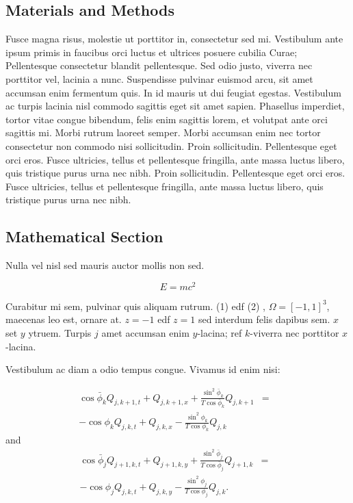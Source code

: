 \documentclass[a0,landscape]{a0poster}
\begin{document}
\begin{multicols}{4}
\section*{Materials and Methods}

Fusce magna risus, molestie ut porttitor in, consectetur sed mi. Vestibulum ante ipsum primis in faucibus orci luctus et ultrices posuere cubilia Curae; Pellentesque consectetur blandit pellentesque. Sed odio justo, viverra nec porttitor vel, lacinia a nunc. Suspendisse pulvinar euismod arcu, sit amet accumsan enim fermentum quis. In id mauris ut dui feugiat egestas. Vestibulum ac turpis lacinia nisl commodo sagittis eget sit amet sapien. Phasellus imperdiet, tortor vitae congue bibendum, felis enim sagittis lorem, et volutpat ante orci sagittis mi. Morbi rutrum laoreet semper. Morbi accumsan enim nec tortor consectetur non commodo nisi sollicitudin. Proin sollicitudin. Pellentesque eget orci eros. Fusce ultricies, tellus et pellentesque fringilla, ante massa luctus libero, quis tristique purus urna nec nibh. Proin sollicitudin. Pellentesque eget orci eros. Fusce ultricies, tellus et pellentesque fringilla, ante massa luctus libero, quis tristique purus urna nec nibh.


\subsection*{Mathematical Section}

Nulla vel nisl sed mauris auctor mollis non sed.

\begin{equation}
E = mc^{2}
\label{eqn:Einstein}
\end{equation}

Curabitur mi sem, pulvinar quis aliquam rutrum. (1) edf (2)
, $\Omega=[-1,1]^3$, maecenas leo est, ornare at. $z=-1$ edf $z=1$ sed interdum felis dapibus sem. $x$ set $y$ ytruem.
Turpis $j$ amet accumsan enim $y$-lacina;
ref $k$-viverra nec porttitor $x$-lacina.

Vestibulum ac diam a odio tempus congue. Vivamus id enim nisi:

\begin{eqnarray}
\cos\bar{\phi}_k Q_{j,k+1,t} + Q_{j,k+1,x}+\frac{\sin^2\bar{\phi}_k}{T\cos\bar{\phi}_k} Q_{j,k+1} &=&\nonumber\\
-\cos\phi_k Q_{j,k,t} + Q_{j,k,x}-\frac{\sin^2\phi_k}{T\cos\phi_k} Q_{j,k}\label{edgek}
\end{eqnarray}
and
\begin{eqnarray}
\cos\bar{\phi}_j Q_{j+1,k,t} + Q_{j+1,k,y}+\frac{\sin^2\bar{\phi}_j}{T\cos\bar{\phi}_j} Q_{j+1,k}&=&\nonumber \\
-\cos\phi_j Q_{j,k,t} + Q_{j,k,y}-\frac{\sin^2\phi_j}{T\cos\phi_j} Q_{j,k}.\label{edgej}
\end{eqnarray}


\end{multicols}
\end{document}
